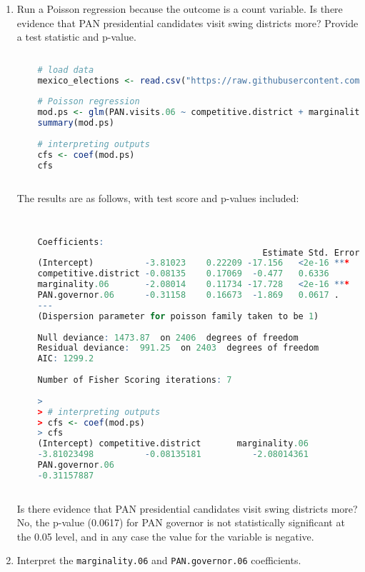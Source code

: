 \documentclass[12pt,letterpaper]{article}
\begin{document}
\begin{enumerate}
	\item [(a)]
	Run a Poisson regression because the outcome is a count variable. Is there evidence that PAN presidential candidates visit swing districts more? Provide a test statistic and p-value.
	
	\begin{lstlisting}[language=R]
	
	# load data
	mexico_elections <- read.csv("https://raw.githubusercontent.com/ASDS-TCD/StatsII_Spring2024/main/datasets/MexicoMuniData.csv")
	
	# Poisson regression
	mod.ps <- glm(PAN.visits.06 ~ competitive.district + marginality.06 + PAN.governor.06, data = mexico_elections, family = poisson)
	summary(mod.ps)
	
	# interpreting outputs
	cfs <- coef(mod.ps)
	cfs
	
	\end{lstlisting}

	The results are as follows, with test score and p-values included:
	
	\begin{lstlisting}[language=R]
	
	
	Coefficients:
												Estimate Std. Error z value Pr(>|z|)    
	(Intercept)          -3.81023    0.22209 -17.156   <2e-16 ***
	competitive.district -0.08135    0.17069  -0.477   0.6336    
	marginality.06       -2.08014    0.11734 -17.728   <2e-16 ***
	PAN.governor.06      -0.31158    0.16673  -1.869   0.0617 .  
	---
	(Dispersion parameter for poisson family taken to be 1)
	
	Null deviance: 1473.87  on 2406  degrees of freedom
	Residual deviance:  991.25  on 2403  degrees of freedom
	AIC: 1299.2
	
	Number of Fisher Scoring iterations: 7
	
	> 
	> # interpreting outputs
	> cfs <- coef(mod.ps)
	> cfs
	(Intercept) competitive.district       marginality.06 
	-3.81023498          -0.08135181          -2.08014361 
	PAN.governor.06 
	-0.31157887 
	
	\end{lstlisting}
	
	Is there evidence that PAN presidential candidates visit swing districts more? No, the p-value  (0.0617) for PAN governor is not statistically significant at the 0.05 level, and in any case the value for the variable is negative.
	
	\item [(b)]
	Interpret the \texttt{marginality.06} and \texttt{PAN.governor.06} coefficients.
	

\end{enumerate}
\end{document}
